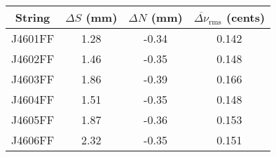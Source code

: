 \begin{tabular}{cccc}
\toprule
String & $\Delta S$ (mm) & $\Delta N$ (mm) & $\overline{\Delta \nu}_\text{rms}$ (cents) \\
\midrule
J4601FF & 1.28 & -0.34 & 0.142 \\
J4602FF & 1.46 & -0.35 & 0.148 \\
J4603FF & 1.86 & -0.39 & 0.166 \\
J4604FF & 1.51 & -0.35 & 0.148 \\
J4605FF & 1.87 & -0.36 & 0.153 \\
J4606FF & 2.32 & -0.35 & 0.151 \\
\bottomrule
\end{tabular}

